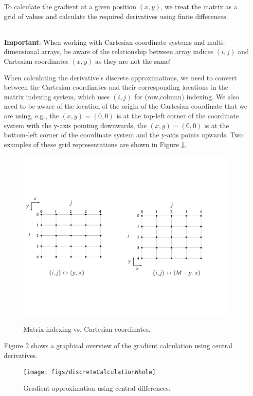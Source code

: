 \documentclass[12pt,letter]{article}
\begin{document}
To calculate the gradient at a given position $(x,y)$, we treat the matrix as a grid of values and calculate the required derivatives using finite differences. \\\\
    \begin{mdframed}[backgroundcolor=yellow!20] 
        {\bf Important}: When working with Cartesian coordinate systems and multi-dimensional arrays, be aware of the relationship between array indices $(i,j)$ and Cartesian coordinates $(x,y)$ as they are not the same!
    \end{mdframed}


\newpage
When calculating the derivative's discrete approximations, we need to convert between the Cartesian coordinates and their corresponding locations in the matrix indexing system, which uses $(i,j)$ for (row,column) indexing. We also need to be aware of the location of the origin of the Cartesian coordinate that we are using, e.g., the $(x,y)=(0,0)$ is at the top-left corner of the coordinate system with the y-axis pointing downwards,  the $(x,y)=(0,0)$ is at the bottom-left corner of the coordinate system and the y-axis points upwards. Two examples of these grid representations are shown in Figure \ref{fig_grid}.
\begin{figure}[H]
	\begin{center}
		{\includegraphics[width=.99\textwidth]{figs/gridFinite}}
	\end{center}
	\caption{Matrix indexing vs. Cartesian coordinates.}
	\label{fig_grid}
\end{figure}

Figure \ref{fig_whole} shows a graphical overview of the gradient calculation using central derivatives.
\begin{figure}[H]
	\begin{center}
		{\texttt{[image: figs/discreteCalculationWhole]}}
	\end{center}
	\caption{Gradient approximation using central differences.}
	\label{fig_whole}
\end{figure}

 

\end{document}
